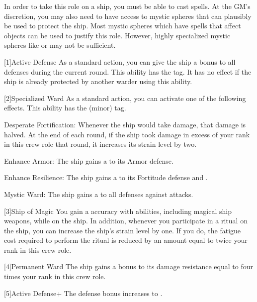        In order to take this role on a ship, you must be able to cast spells.
        At the GM's discretion, you may also need to have access to mystic spheres that can plausibly be used to protect the ship.
        Most mystic spheres which have spells that affect objects can be used to justify this role.
        However, highly specialized mystic spheres like  or  may not be sufficient.

        [1]{Active Defense} As a standard action, you can give the ship a  bonus to all defenses during the current round.
        This ability has the  tag.
        It has no effect if the ship is already protected by another warder using this ability.

        [2]{Specialized Ward} As a standard action, you can activate one of the following effects.
        This ability has the  (minor) tag.
        \begin{raggeditemize}
            \item Desperate Fortification: Whenever the ship would take damage, that damage is halved.
                At the end of each round, if the ship took damage in excess of your rank in this crew role that round, it increases its strain level by two.
            \item Enhance Armor: The ship gains a   to its Armor defense.
            \item Enhance Resilience: The ship gains a   to its Fortitude defense and .
            \item Mystic Ward: The ship gains a   to all defenses against \magical attacks.
        \end{raggeditemize}

        [3]{Ship of Magic} You gain a  accuracy with \magical abilities, including magical ship weapons, while on the ship.
        In addition, whenever you participate in a ritual on the ship, you can increase the ship's strain level by one.
        If you do, the fatigue cost required to perform the ritual is reduced by an amount equal to twice your rank in this crew role.

        [4]{Permanent Ward} The ship gains a bonus to its damage resistance equal to four times your rank in this crew role.

        [5]{Active Defense+} The defense bonus increases to .

